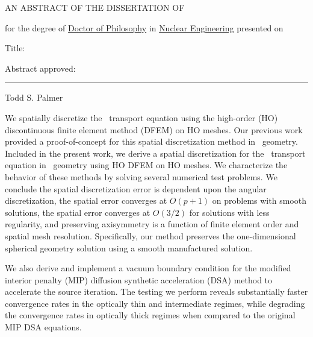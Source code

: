 \documentclass[12pt]{article}
\begin{document}
\begin{singlespace}

\begin{center}
AN ABSTRACT OF THE DISSERTATION OF
\end{center}

\vspace{12pt}

\noindent
\uline{\ThesisAuthor} for the degree of \uline{Doctor of Philosophy} in \uline{Nuclear Engineering} presented on \uline{\DefenseDate}

\vspace{12pt}

\noindent
Title: \uline{\ThesisTitle}

\vspace{12pt}

\noindent
Abstract approved:

\vspace{12pt}

\noindent
\begin{center}
\rule{\textwidth}{0.4pt}

\noindent
Todd S. Palmer
\end{center}

\vspace{12pt}

\end{singlespace}

We spatially discretize the \SN\ transport equation using the high-order (HO) discontinuous finite element method (DFEM) on HO meshes. Our previous work provided a proof-of-concept for this spatial discretization method in \XY\ geometry. Included in the present work, we derive a spatial discretization for the \SN\ transport equation in \RZ\ geometry using HO DFEM on HO meshes. We characterize the behavior of these methods by solving several numerical test problems. We conclude the spatial discretization error is dependent upon the angular discretization, the spatial error converges at $O(p+1)$ on problems with smooth solutions, the spatial error converges at $O(3/2)$ for solutions with less regularity, and preserving axisymmetry is a function of finite element order and spatial mesh resolution. Specifically, our method preserves the one-dimensional spherical geometry solution using a smooth manufactured solution.

We also derive and implement a vacuum boundary condition for the modified interior penalty (MIP) diffusion synthetic acceleration (DSA) method to accelerate the source iteration. The testing we perform reveals substantially faster convergence rates in the optically thin and intermediate regimes, while degrading the convergence rates in optically thick regimes when compared to the original MIP DSA equations.
\end{document}
